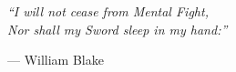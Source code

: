 \documentclass[
  ignorenonframetext,
]{beamer}
\author{\texorpdfstring{}{}}
\date{}
\begin{document}
\begin{frame}
\vspace*{2cm}

\begin{center}
\begin{minipage}{0.7\textwidth}
\centering
\Large\itshape
``I will not cease from Mental Fight,\\[0.3em]
Nor shall my Sword sleep in my hand:''
\vspace{1em}

\normalsize\upshape
--- William Blake
\end{minipage}
\end{center}

\vspace{2cm}

\newpage
\tableofcontents
\newpage
\end{frame}
\end{document}
